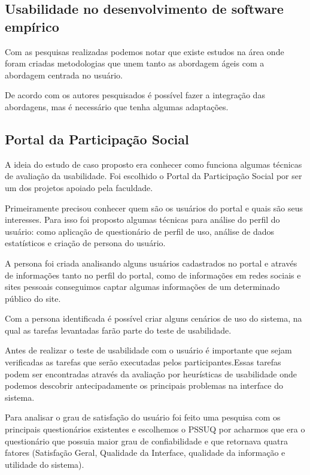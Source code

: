 \subsection{Usabilidade no desenvolvimento de software empírico}

Com as pesquisas realizadas podemos notar que existe estudos na área onde foram criadas metodologias que unem tanto as abordagem ágeis com a abordagem centrada no usuário.

De acordo com os autores pesquisados é possível fazer a integração das abordagens, mas é necessário que tenha algumas adaptações.


\subsection{Portal da Participação Social} 

	A ideia do estudo de caso proposto era conhecer como funciona algumas técnicas de avaliação da usabilidade. Foi escolhido o Portal da Participação Social por ser um dos projetos apoiado pela faculdade.

	Primeiramente precisou conhecer quem são os usuários do portal e quais são seus interesses. Para isso foi proposto algumas técnicas para análise do perfil do usuário: como aplicação de questionário de perfil de uso, análise de dados estatísticos e criação de persona do usuário.

	A persona foi criada analisando alguns usuários cadastrados no portal e através de informações tanto no perfil do portal, como de informações em redes sociais e sites pessoais conseguimos captar algumas informações de um determinado público do site.

	Com a persona identificada é possível criar alguns cenários de uso do sistema, na qual as tarefas levantadas farão parte do teste de usabilidade.

	Antes de realizar o teste de usabilidade com o usuário é importante que sejam verificadas as tarefas que serão executadas pelos participantes.Essas tarefas podem ser encontradas através da avaliação por heurísticas de usabilidade onde podemos descobrir antecipadamente os principais problemas na interface do sistema.

	Para analisar o grau de satisfação do usuário foi feito uma pesquisa com os principais questionários existentes e escolhemos o PSSUQ por acharmos que era o questionário que possuia maior grau de confiabilidade e que retornava quatra fatores (Satisfação Geral, Qualidade da Interface, qualidade da informação e utilidade do sistema).

